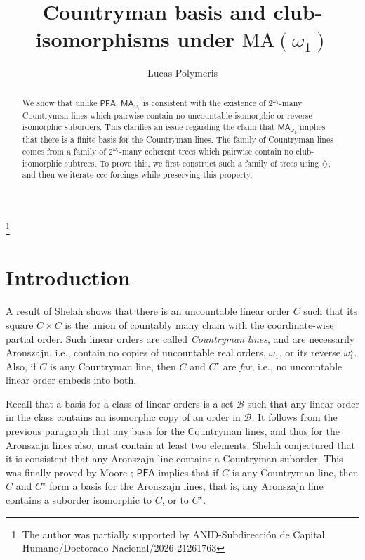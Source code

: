 \documentclass[a4paper,noamsfonts]{amsart}
\theoremstyle{definition}
\newcommand{\PFA}{\textsf{PFA}}
\newcommand{\MA}{\textsf{MA}}
\newcommand{\1}{\mathbf{1}}
\newcommand{\dia}{\diamondsuit}
\begin{document}
\title[Countryman basis and club-isomorphisms under $\text{MA}(\omega_{1})$]
{Countryman basis and club-isomorphisms
  under $\text{MA}(\omega_{1})$}

\author{Lucas Polymeris}
\address{Department of Mathematics, Universidad de Concepción, Concepción, Chile}


\thanks{The author was partially supported by
  ANID-Subdirección de Capital Humano/Doctorado Nacional/2026-21261763}



\begin{abstract}
  We show that unlike $\PFA$,
  $\MA_{\omega_{1}}$ is consistent with the existence
  of $2^{\omega_{1}}$-many Countryman lines which pairwise contain no
  uncountable isomorphic or reverse-isomorphic suborders.
  This clarifies an issue regarding the claim
  that $\MA_{\omega_{1}}$ implies that there is a finite basis for the Countryman
  lines. The family of Countryman lines comes from
  a family of $2^{\omega_{1}}$-many coherent
  trees which pairwise contain no club-isomorphic subtrees. To prove this,
  we first construct such a family of trees using $\dia$, and then we iterate
  ccc forcings while preserving this property.
\end{abstract}


\maketitle

\section{Introduction}

A result of Shelah \cite{Shelah1976} shows that there is an
uncountable linear order $C$ such that its square $C \times C$ is the
union of countably many chain with the coordinate-wise partial order.
Such linear orders are called \emph{Countryman lines}, and are
necessarily Aronszajn, i.e., contain no copies of uncountable real
orders, $\omega_{1}$, or its reverse $\omega_{1}^{\star}$. Also, if
$C$ is any Countryman line, then $C$ and $C^{\star}$ are
\emph{far}, i.e., no uncountable linear order embeds into both.

Recall that a basis for a class of linear orders is a set
$\mathcal{B}$ such that any linear order in the class contains an
isomorphic copy of an order in $\mathcal{B}$. It follows from
the previous paragraph that any basis
for the Countryman lines, and thus for the Aronszajn lines also, must
contain at least two elements. Shelah \cite{Shelah1976} conjectured
that it is consistent that any Aronszajn line contains a Countryman
suborder. This was finally proved by Moore \cite{5-basis}; $\PFA$
implies that if $C$ is any Countryman line, then $C$ and $C^{\star}$ form
a basis for the Aronszajn lines, that is, any Aronszajn line contains
a suborder isomorphic to $C$, or to $C^{\star}$.
\end{document}
